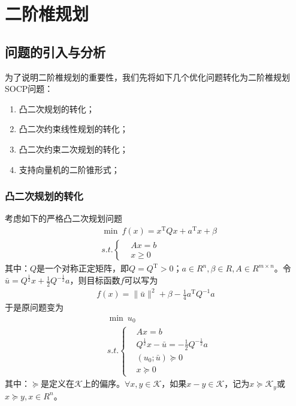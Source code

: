 % 
\chapter{二阶椎规划}
\section{问题的引入与分析}
    \par
    为了说明二阶椎规划的重要性，我们先将如下几个优化问题转化为二阶椎规划SOCP问题：
    \begin{enumerate}
    \item 凸二次规划的转化；
    \item 凸二次约束线性规划的转化；
    \item 凸二次约束二次规划的转化；
    \item 支持向量机的二阶锥形式；
    \end{enumerate}
    \subsection{凸二次规划的转化}
        \par
        考虑如下的严格凸二次规划问题
        \begin{align*}
          & \mathop{\min}\  f(x) = x^\mathrm{T} Qx+a^\mathrm{T} x+\beta\\
          & s.t.\left\{
            \begin{aligned}
             &Ax=b\\
             &x \geqslant 0
            \end{aligned}
             \right.
        \end{align*}
        其中：$Q$是一个对称正定矩阵，即$Q=Q^\mathrm{T}>0$；$a \in R^n,\beta \in R,A\in R^{m\times n}$。令$\bar{u}=Q^{\frac 12}x+{\frac 12}Q^{-\frac 12}a$，则目标函数$f$可以写为
        \begin{align*}
          f(x) = \|\bar{u}\|^2+\beta-\frac 14a^\mathrm{T} Q^{-1}a
        \end{align*}
        于是原问题变为
        \begin{align*}
          & \mathop{\min} \  u_0\\
          & s.t.\left\{
            \begin{aligned}
             &Ax=b\\
             &Q^{\frac 12}x-\bar{u}=-\frac 12 Q^{-\frac 12}a\\
             &(u_0;\bar{u}) \succeq 0\\
             &x \succeq 0
            \end{aligned}
             \right.
        \end{align*}
        其中：$\succeq$是定义在$\mathcal{K}$上的偏序。$\forall x,y \in \mathcal{K}$，如果$x - y \in \mathcal{K}$，记为$x \succeq \mathcal{K}_y$或$x \succeq y,x \in R^n$。
